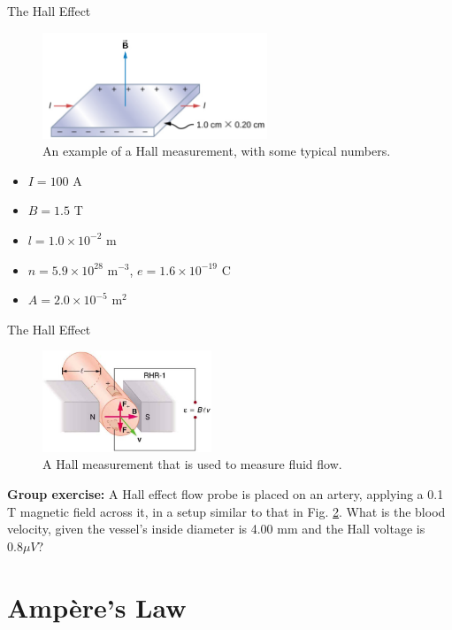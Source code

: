 \documentclass{beamer}
\begin{document}
\begin{frame}{The Hall Effect}
\small
\begin{figure}
\centering
\includegraphics[width=0.6\textwidth]{figures/Hall2.png}
\caption{\label{fig:Hall2} An example of a Hall measurement, with some typical numbers.}
\end{figure}
\begin{itemize}
\item $I = 100$ A
\item $B = 1.5$ T
\item $l = 1.0\times 10^{-2}$ m
\item $n = 5.9 \times 10^{28}$ m$^{-3}$, $e = 1.6 \times 10^{-19}$ C
\item $A = 2.0 \times 10^{-5}$ m$^{2}$
\end{itemize}
\end{frame}

\begin{frame}{The Hall Effect}
\small
\begin{figure}
\centering
\includegraphics[width=0.45\textwidth]{figures/Hall3.png}
\caption{\label{fig:Hall3} A Hall measurement that is used to measure fluid flow.}
\end{figure}
\textbf{Group exercise:} A Hall effect flow probe is placed on an artery, applying a 0.1 T magnetic field across it, in a setup similar to that in Fig. \ref{fig:Hall3}. What is the blood velocity, given the vessel’s inside diameter is 4.00 mm and the Hall voltage is $0.8 \mu V$?
\end{frame}

\section{Amp\`{e}re's Law}
\end{document}
